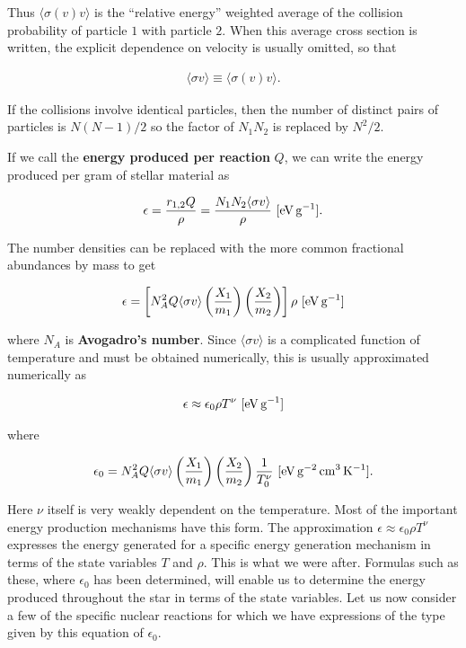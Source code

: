 \documentclass[a4paper,10pt]{article}
\begin{document}
{\noindent}Thus $\langle\sigma(v)v\rangle$ is the ``relative energy'' weighted average of the collision probability of particle $1$ with particle $2$. When this average cross section is written, the explicit dependence on velocity is usually omitted, so that

\begin{align*}
    \langle\sigma v\rangle \equiv \langle\sigma(v)v\rangle.
\end{align*}

{\noindent}If the collisions involve identical particles, then the number of distinct pairs of particles is $N(N-1)/2$ so the factor of $N_1N_2$ is replaced by $N^2/2$.

{\noindent}If we call the \textbf{energy produced per reaction} $Q$, we can write the energy produced per gram of stellar material as

\begin{align*}
    \epsilon = \frac{r_{1,2}Q}{\rho} = \frac{N_1N_2\langle\sigma v\rangle}{\rho} ~ [{\rm eV\,g^{-1}}].
\end{align*}

{\noindent}The number densities can be replaced with the more common fractional abundances by mass to get

\begin{align*}
    \epsilon = \left[ N_A^2Q \langle\sigma v\rangle \left(\frac{X_1}{m_1}\right) \left(\frac{X_2}{m_2}\right) \right] \rho ~ [{\rm eV\,g^{-1}}]
\end{align*}

{\noindent}where $N_A$ is \textbf{Avogadro's number}. Since $\langle\sigma v\rangle$ is a complicated function of temperature and must be obtained numerically, this is usually approximated numerically as

\begin{align*}
    \epsilon \approx \epsilon_0\rho T^\nu ~ [{\rm eV\,g^{-1}}]
\end{align*}

{\noindent}where

\begin{align*}
    \epsilon_0 = N_A^2Q \langle\sigma v\rangle \left(\frac{X_1}{m_1}\right) \left(\frac{X_2}{m_2}\right) \frac{1}{T_0^\nu} ~ [{\rm eV\,g^{-2}\,cm^3\,K^{-1}}].
\end{align*}

{\noindent}Here $\nu$ itself is very weakly dependent on the temperature. Most of the important energy production mechanisms have this form. The approximation $\epsilon\approx\epsilon_0\rho T^\nu$ expresses the energy generated for a specific energy generation mechanism in terms of the state variables $T$ and $\rho$. This is what we were after. Formulas such as these, where $\epsilon_0$ has been determined, will enable us to determine the energy produced throughout the star in terms of the state variables. Let us now consider a few of the specific nuclear reactions for which we have expressions of the type given by this equation of $\epsilon_0$.
\end{document}
